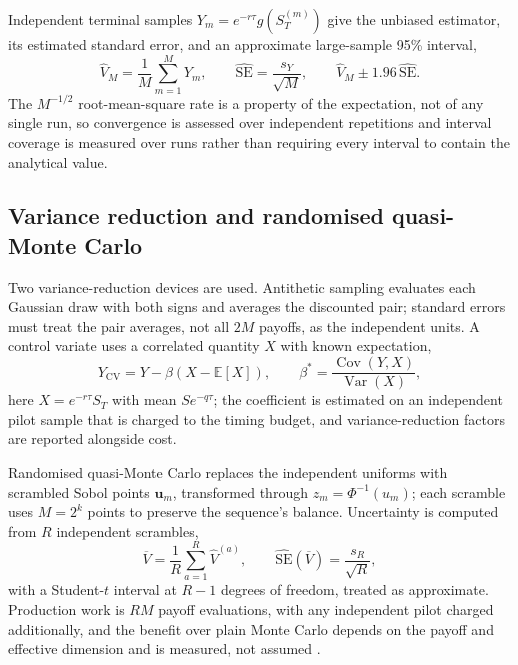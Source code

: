 \documentclass[11pt,a4paper]{article}
\begin{document}
Independent terminal samples \(Y_m=e^{-r\tau}g(S_T^{(m)})\) give the
unbiased estimator, its estimated standard error, and an approximate
large-sample 95\% interval,
\begin{equation}
 \widehat V_M=\frac1M\sum_{m=1}^M Y_m,\qquad
 \widehat{\mathrm{SE}}=\frac{s_Y}{\sqrt M},\qquad
 \widehat V_M\pm1.96\,\widehat{\mathrm{SE}}.
\end{equation}
The \(M^{-1/2}\) root-mean-square rate \cite{glasserman2004} is a property
of the expectation, not of any single run, so convergence is assessed over
independent repetitions and interval coverage is measured over runs rather
than requiring every interval to contain the analytical value.

\subsection{Variance reduction and randomised quasi-Monte Carlo}

Two variance-reduction devices are used. Antithetic sampling evaluates
each Gaussian draw with both signs and averages the discounted pair;
standard errors must treat the pair averages, not all \(2M\) payoffs, as
the independent units. A control variate uses a correlated quantity \(X\)
with known expectation,
\begin{equation}
 Y_{\mathrm{CV}}=Y-\beta(X-\mathbb E[X]),\qquad
 \beta^*=\frac{\operatorname{Cov}(Y,X)}{\operatorname{Var}(X)},
 \label{eq:cv}
\end{equation}
here \(X=e^{-r\tau}S_T\) with mean \(Se^{-q\tau}\); the coefficient is
estimated on an independent pilot sample that is charged to the timing
budget, and variance-reduction factors are reported alongside cost.

Randomised quasi-Monte Carlo replaces the independent uniforms with
scrambled Sobol points \(\mathbf u_m\), transformed through
\(z_m=\Phi^{-1}(u_m)\); each scramble uses \(M=2^k\) points to preserve the
sequence's balance. Uncertainty is computed from \(R\) independent
scrambles,
\begin{equation}
 \overline V=\frac1R\sum_{a=1}^R\widehat V^{(a)},\qquad
 \widehat{\mathrm{SE}}(\overline V)=\frac{s_R}{\sqrt R},
\end{equation}
with a Student-\(t\) interval at \(R-1\) degrees of freedom, treated as
approximate. Production work is \(RM\) payoff evaluations, with any
independent pilot charged additionally, and the benefit over
plain Monte Carlo depends on the payoff and effective dimension and is
measured, not assumed \cite{glasserman2004}.
\end{document}
